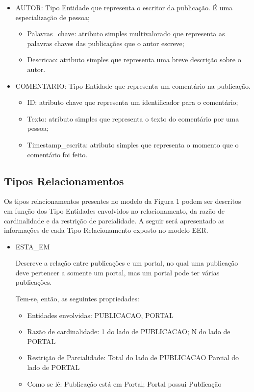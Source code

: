 \begin{itemize}
\item AUTOR: Tipo Entidade que representa o escritor da publicação. É uma especialização de pessoa;
				\begin{itemize}
\item Palavras\_chave: atributo simples multivalorado que representa as palavras chaves das publicações que o autor escreve;
\item Descricao: atributo simples que representa uma breve descrição sobre o autor.
				\end{itemize}
				\end{itemize}
				\begin{itemize}
\item COMENTARIO: Tipo Entidade que representa um comentário na publicação.
				\begin{itemize}
\item ID: atributo chave que representa um identificador para o comentário;
\item Texto: atributo simples que representa o texto do comentário por uma pessoa;
\item Timestamp\_escrita: atributo simples que representa o momento que o comentário foi feito.
				\end{itemize}
				\end{itemize}
\subsection{Tipos Relacionamentos}

Os tipos relacionamentos presentes no modelo da Figura 1 podem ser descritos em função dos Tipo Entidades envolvidos no relacionamento, da razão de cardinalidade e da restrição de parcialidade. A seguir será apresentado as informações de cada Tipo Relacionamento exposto no modelo EER.

\begin{itemize}
				
\item ESTA\_EM

Descreve a relação entre publicações e um portal, no qual uma publicação deve pertencer a somente um portal, mas um portal pode ter várias publicações.

Tem-se, então, as seguintes propriedades:

\begin{itemize}

\item Entidades envolvidas: PUBLICACAO, PORTAL
\item Razão de cardinalidade: 1 do lado de PUBLICACAO; N do lado de PORTAL
\item Restrição de Parcialidade: Total do lado de PUBLICACAO                        Parcial do lado de PORTAL
\item Como se lê: Publicação está em Portal; Portal possui Publicação
\end{itemize}
\end{itemize}

